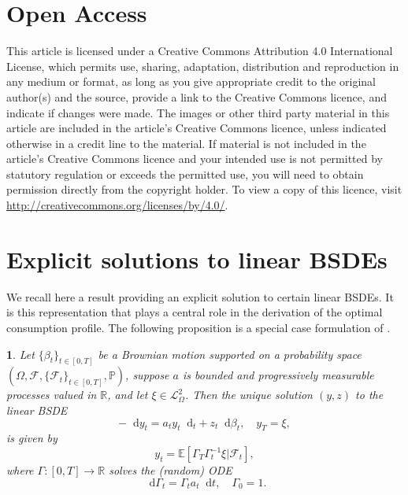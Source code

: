 \documentclass[11pt,oneside,english,reqno,dvipsnames,table]{amsart}
\numberwithin{equation}{section}
\theoremstyle{plain}
\theoremstyle{definition}
\theoremstyle{remark}
\theoremstyle{plain}
\theoremstyle{plain}
\newtheorem{prop}[thm]{\protect\propositionname}
\theoremstyle{plain}
\theoremstyle{plain}
\theoremstyle{plain}
\theoremstyle{plain}
\theoremstyle{plain}
\providecommand{\propositionname}{Proposition}
\newcommand{\cF}{\mathcal{F}}
\newcommand{\scL}{\mathscr{L}}
\newcommand{\EE}{\mathbb{E}}
\newcommand{\PP}{\mathbb{P}}
\newcommand{\RR}{\mathbb{R}}
\newcommand{\dd}{\mathop{}\!\mathrm{d}}
\numberwithin{thm}{section}
\begin{document}
\section*{Open Access}
This article is licensed under a Creative Commons Attribution 4.0 International License, which permits use, sharing, adaptation, distribution and reproduction in any medium or format, as long as you give appropriate credit to the original author(s) and the source, provide a link to the Creative Commons licence, and indicate if changes were made. The images or other third party material in this article are included in the article's Creative Commons licence, unless indicated otherwise in a credit line to the material. If material is not included in the article's Creative Commons licence and your intended use is not permitted by statutory regulation or exceeds the permitted use, you will need to obtain permission directly from the copyright holder. To view a copy of this licence, visit \url{http://creativecommons.org/licenses/by/4.0/}.








\newpage
\appendix

\section{Explicit solutions to linear BSDEs}
We recall here a result providing an explicit solution to certain linear BSDEs. It is this representation that plays a central role in the derivation of the optimal consumption profile.
The following proposition is a special case formulation of \cite[Prop. 6.2.1]{pham_09_continuous}. 

\begin{prop}\label{prop: linear BSDE}
Let $\{\beta_t\}_{t\in [0,T]}$ be a Brownian motion supported on a probability space $(\Omega,\cF,\{\cF_t\}_{t\in [0,T]},\PP)$, suppose $a$ is bounded and progressively measurable processes valued in $\RR$, and let $\xi\in \scL^2_\Omega$. Then the unique solution $(y,z)$ to the linear BSDE 
%
\begin{equation*}
    -\dd y_t =a_t y_t\dd_t + z_t \dd \beta_t,\quad y_T=\xi, 
\end{equation*}
%
is given by 
%
\begin{equation*}
    y_t = \EE[\Gamma_T  \Gamma_t^{-1} \xi|\cF_t], 
\end{equation*}
%
where $\Gamma:[0,T]\rightarrow \RR$ solves the (random) ODE
%
\begin{equation*}
    \dd \Gamma_t = \Gamma_t a_t \dd t,\quad \Gamma_0=1. 
\end{equation*}
\end{prop}
\end{document}

